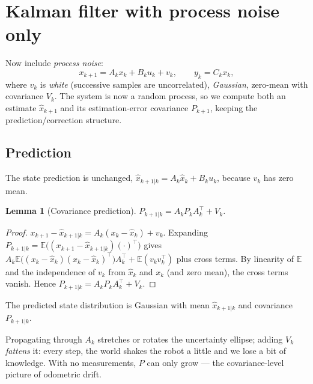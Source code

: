 \documentclass[11pt,a4paper]{article}
\def\boldsymbol#1{#1}%
\def\mathbf#1{#1}%
\newcommand{\E}{\mathbb{E}}
\newcommand{\tp}{^{\top}}
\newcommand{\hx}{\hat{\boldsymbol{x}}}
\newcommand{\bx}{\boldsymbol{x}}
\newcommand{\bu}{\boldsymbol{u}}
\newcommand{\by}{\boldsymbol{y}}
\newcommand{\bv}{\boldsymbol{v}}
\newcommand{\mA}{\mathbf{A}}
\newcommand{\mB}{\mathbf{B}}
\newcommand{\mC}{\mathbf{C}}
\newcommand{\mP}{\mathbf{P}}
\newcommand{\mV}{\mathbf{V}}
\newcommand{\slides}[1]{\texorpdfstring{\hspace{0.5em}{\normalfont\small\emph{(#1)}}}{}}
\theoremstyle{definition}
\theoremstyle{plain}
\newtheorem{lemma}[definition]{Lemma}
\theoremstyle{remark}
\begin{document}
\section{Kalman filter with process noise only \slides{EKF deck, slides 10--15}}

Now include \emph{process noise}:
\begin{equation}\label{eq:lin-process}
\bx_{k+1}=\mA_k\bx_k+\mB_k\bu_k+\bv_k,\qquad \by_k=\mC_k\bx_k,
\end{equation}
where $\bv_k$ is \emph{white} (successive samples are uncorrelated), \emph{Gaussian}, zero-mean with covariance $\mV_k$.
The system is now a random process, so we compute both an estimate $\hx_{k+1}$ and its estimation-error covariance
$\mP_{k+1}$, keeping the prediction/correction structure.

\subsection{Prediction}

The state prediction is unchanged, $\hx_{k+1|k}=\mA_k\hx_k+\mB_k\bu_k$, because $\bv_k$ has zero mean.

\begin{lemma}[Covariance prediction]\label{lem:covpred}
$\mP_{k+1|k}=\mA_k\mP_k\mA_k\tp+\mV_k$.
\end{lemma}
\begin{proof}
$\bx_{k+1}-\hx_{k+1|k}=\mA_k(\bx_k-\hx_k)+\bv_k$. Expanding $\mP_{k+1|k}=\E\big((\bx_{k+1}-\hx_{k+1|k})(\cdot)\tp\big)$ gives
$\mA_k\E\big((\bx_k-\hx_k)(\bx_k-\hx_k)\tp\big)\mA_k\tp+\E(\bv_k\bv_k\tp)$ plus cross terms. By linearity of $\E$ and the independence of $\bv_k$
from $\hx_k$ and $\bx_k$ (and zero mean), the cross terms vanish. Hence $\mP_{k+1|k}=\mA_k\mP_k\mA_k\tp+\mV_k$.
\end{proof}

The predicted state distribution is Gaussian with mean $\hx_{k+1|k}$ and covariance $\mP_{k+1|k}$.

\begin{intuition}
Propagating through $\mA_k$ stretches or rotates the uncertainty ellipse; adding $\mV_k$ \emph{fattens} it: every step, the
world shakes the robot a little and we lose a bit of knowledge. With no measurements, $\mP$ can only grow --- the
covariance-level picture of odometric drift.
\end{intuition}
\end{document}
